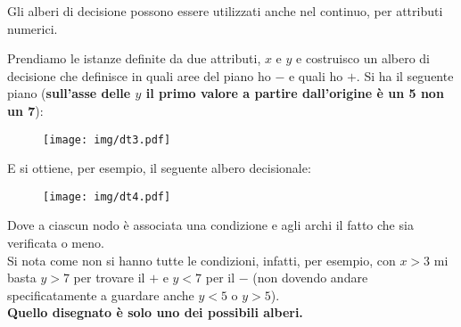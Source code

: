 Gli alberi di decisione possono essere utilizzati anche nel continuo, per
attributi numerici.
\begin{esempio}
  Prendiamo le istanze definite da due attributi, $x$ e $y$ e costruisco un
  albero di decisione che definisce in quali aree del piano ho $-$ e quali ho
  $+$.
  \newpage
  Si ha il seguente piano (\textbf{sull'asse delle $y$ il primo valore a partire
  dall'origine è un 5 non un 7}): 
  \begin{figure}[H]
    \centering
    \texttt{[image: img/dt3.pdf]}
  \end{figure}
  E si ottiene, per esempio, il seguente albero decisionale:
  \begin{figure}[H]
    \centering
    \texttt{[image: img/dt4.pdf]}
  \end{figure}
  Dove a ciascun nodo è associata una condizione e agli archi il fatto che sia
  verificata o meno.\\
  Si nota come non si hanno tutte le condizioni, infatti, per esempio, con $x>3$
  mi basta $y>7$ per trovare il $+$ e $y<7$ per il $-$ (non dovendo andare
  specificatamente a guardare anche $y<5$ o $y>5$).\\
  \textbf{Quello disegnato è solo uno dei possibili alberi.}
\end{esempio}
